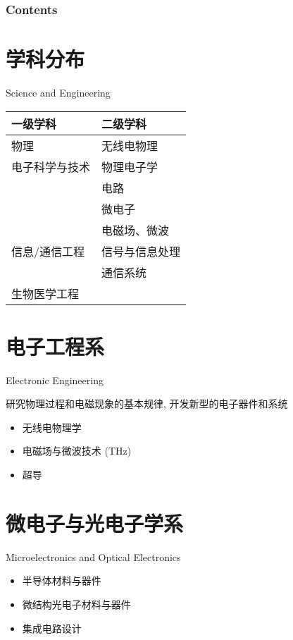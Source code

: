 \documentclass[10pt,t]{beamer}
\subtitle{\hspace{1.5em}Departments and Majors}
\date{}
\begin{document}
\begin{frame}
  \maketitle
\end{frame}

\begin{frame}\frametitle<presentation>{Contents}
  \tableofcontents
\end{frame}

\section{学科分布}
\begin{frame}{Science and Engineering}
\centering
    \fontsize{12}{16}\selectfont
\begin{tabular}{ll}\hline
    一级学科  &  二级学科\\\hline
    物理      & 无线电物理\\
    电子科学与技术 & 物理电子学 \\
                   & 电路\\
                   & 微电子\\
                   & 电磁场、微波\\
    信息/通信工程  & 信号与信息处理\\
                   & 通信系统\\
    生物医学工程   &\\\hline
\end{tabular}
\end{frame}

\section{电子工程系}
\begin{frame}{Electronic Engineering}

    研究物理过程和电磁现象的基本规律, 开发新型的电子器件和系统
\begin{itemize}
    \item 无线电物理学
    \item 电磁场与微波技术 (THz)
    \item 超导
\end{itemize}
    
\end{frame}

\section{微电子与光电子学系}
\begin{frame}{Microelectronics and Optical Electronics}
\begin{itemize}
    \item 半导体材料与器件
    \item 微结构光电子材料与器件
    \item 集成电路设计
\end{itemize}
\end{frame}
\end{document}
